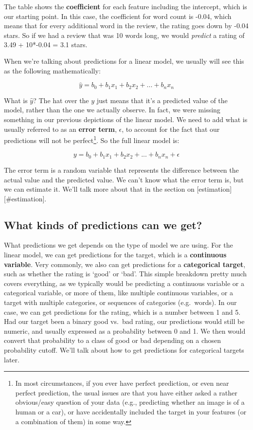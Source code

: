 \documentclass[
  letterpaper,
]{krantz}
\begin{document}
The table shows the \textbf{coefficient} for each feature including the
intercept, which is our starting point. In this case, the coefficient
for word count is -0.04, which means that for every additional word in
the review, the rating goes down by -0.04 stars. So if we had a review
that was 10 words long, we would \emph{predict} a rating of 3.49 +
10*-0.04 = 3.1 stars.

When we're talking about predictions for a linear model, we usually will
see this as the following mathematically:

\[
\hat{y} = b_0 + b_1x_1 + b_2x_2 + ... + b_nx_n
\]

What is \(\hat{y}\)? The hat over the \(y\) just means that it's a
predicted value of the model, rather than the one we actually observe.
In fact, we were missing something in our previous depictions of the
linear model. We need to add what is usually referred to as an
\textbf{error term}, \(\epsilon\), to account for the fact that our
predictions will not be perfect\footnote{In most circumstances, if you
  ever have perfect prediction, or even near perfect prediction, the
  usual issues are that you have either asked a rather obvious/easy
  question of your data (e.g., predicting whether an image is of a human
  or a car), or have accidentally included the target in your features
  (or a combination of them) in some way.}. So the full linear model is:

\[
y = b_0 + b_1x_1 + b_2x_2 + ... + b_nx_n + \epsilon
\]

The error term is a random variable that represents the difference
between the actual value and the predicted value. We can't know what the
error term is, but we can estimate it. We'll talk more about that in the
section on {[}estimation{]}{[}\#estimation{]}.

\subsection{What kinds of predictions can we
get?}\label{what-kinds-of-predictions-can-we-get}

What predictions we get depends on the type of model we are using. For
the linear model, we can get predictions for the target, which is a
\textbf{continuous variable}. Very commonly, we also can get predictions
for a \textbf{categorical target}, such as whether the rating is `good'
or `bad'. This simple breakdown pretty much covers everything, as we
typically would be predicting a continuous variable or a categorical
variable, or more of them, like multiple continuous variables, or a
target with multiple categories, or sequences of categories
(e.g.~words). In our case, we can get predictions for the rating, which
is a number between 1 and 5. Had our target been a binary good vs.~bad
rating, our predictions would still be numeric, and usually expressed as
a probability between 0 and 1. We then would convert that probability to
a class of good or bad depending on a chosen probability cutoff. We'll
talk about how to get predictions for categorical targets later.
\end{document}
